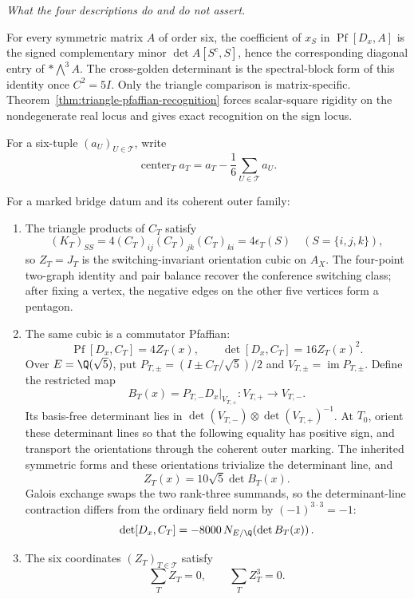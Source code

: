 \smallskip
\noindent\emph{What the four descriptions do and do not assert.}\par
For every symmetric matrix \(A\) of order six, the coefficient of \(x_S\) in
\(\operatorname{Pf}[D_x,A]\) is the signed complementary minor
\(\det A[S^c,S]\), hence the corresponding diagonal entry of
\(*\!\bigwedge^3A\).  The cross-golden determinant is the spectral-block form
of this identity once \(C^2=5I\).  Only the triangle comparison is
matrix-specific.
Theorem~\ref{thm:triangle-pfaffian-recognition} forces scalar-square rigidity
on the nondegenerate real locus and gives exact recognition on the sign locus.

For a six-tuple \((a_U)_{U\in\mathcal T}\), write
\[
 \operatorname{center}_T a_T
 =a_T-\frac16\sum_{U\in\mathcal T}a_U.
\]

\begin{theorem}
\label{thm:operator-shadows}
For a marked bridge datum and its coherent outer family:
\begin{enumerate}
\item The triangle products of \(C_T\) satisfy
\[
 (K_T)_{SS}=4(C_T)_{ij}(C_T)_{jk}(C_T)_{ki}=4\epsilon_T(S)
 \quad(S=\{i,j,k\}),
\]
so \(Z_T=J_T\) is the switching-invariant orientation cubic on \(A_X\).
The four-point two-graph identity and pair balance recover the conference
switching class; after fixing a vertex, the negative edges on the other five
vertices form a pentagon.
\item The same cubic is a commutator Pfaffian:
\[
 \operatorname{Pf}[D_x,C_T]=4Z_T(x),
 \qquad
 \det[D_x,C_T]=16Z_T(x)^2.
\]
Over \(E=\Q(\sqrt5)\), put
\(P_{T,\pm}=(I\pm C_T/\sqrt5)/2\) and
\(V_{T,\pm}=\operatorname{im}P_{T,\pm}\).  Define the restricted map
\[
 B_T(x)=P_{T,-}D_x\big|_{V_{T,+}}:V_{T,+}\longrightarrow V_{T,-}.
\]
Its basis-free determinant lies in
\(\det(V_{T,-})\otimes\det(V_{T,+})^{-1}\).  At \(T_0\), orient these
determinant lines so that the following equality has positive sign, and
transport the orientations through the coherent outer marking.  The inherited
symmetric forms and these orientations trivialize the determinant line, and
\[
 Z_T(x)=10\sqrt5\det B_T(x).
\]
Galois exchange swaps the two rank-three summands, so the determinant-line
contraction differs from the ordinary field norm by \((-1)^{3\cdot3}=-1\):
\[
 \det[D_x,C_T]
 =-8000\,N_{E/\Q}\!\left(\det B_T(x)\right).
\]
\item The six coordinates \((Z_T)_{T\in\mathcal T}\) satisfy
\[
 \sum_TZ_T=0,\qquad \sum_TZ_T^3=0.
\]
\end{enumerate}
\end{theorem}
